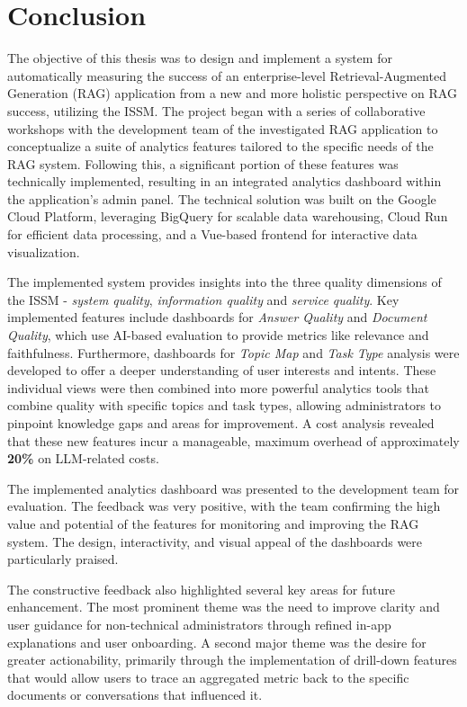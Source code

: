 \documentclass[
	english,
	ruledheaders=section,%
	class=report,%
	thesis={type=bachelor},%
	accentcolor=1b,%
	custommargins=true,%
	marginpar=false,%
	parskip=half-,%
	fontsize=11pt,%
	DIV=14,
]{tudapub}
\begin{document}
\chapter{Conclusion}
The objective of this thesis was to design and implement a system for automatically measuring the success of an enterprise-level Retrieval-Augmented Generation (RAG) application from a new and more holistic perspective on RAG success, utilizing the ISSM. The project began with a series of collaborative workshops with the development team of the investigated RAG application to conceptualize a suite of analytics features tailored to the specific needs of the RAG system. Following this, a significant portion of these features was technically implemented, resulting in an integrated analytics dashboard within the application's admin panel. The technical solution was built on the Google Cloud Platform, leveraging BigQuery for scalable data warehousing, Cloud Run for efficient data processing, and a Vue-based frontend for interactive data visualization.

The implemented system provides insights into the three quality dimensions of the ISSM - \textit{system quality}, \textit{information quality} and \textit{service quality}. Key implemented features include dashboards for \textit{Answer Quality} and \textit{Document Quality}, which use AI-based evaluation to provide metrics like relevance and faithfulness. Furthermore, dashboards for \textit{Topic Map} and \textit{Task Type} analysis were developed to offer a deeper understanding of user interests and intents. These individual views were then combined into more powerful analytics tools that combine quality with specific topics and task types, allowing administrators to pinpoint knowledge gaps and areas for improvement. A cost analysis revealed that these new features incur a manageable, maximum overhead of approximately \textbf{20\%} on LLM-related costs.

The implemented analytics dashboard was presented to the development team for evaluation. The feedback was very positive, with the team confirming the high value and potential of the features for monitoring and improving the RAG system. The design, interactivity, and visual appeal of the dashboards were particularly praised.

The constructive feedback also highlighted several key areas for future enhancement. The most prominent theme was the need to improve clarity and user guidance for non-technical administrators through refined in-app explanations and user onboarding. A second major theme was the desire for greater actionability, primarily through the implementation of drill-down features that would allow users to trace an aggregated metric back to the specific documents or conversations that influenced it.
\end{document}
